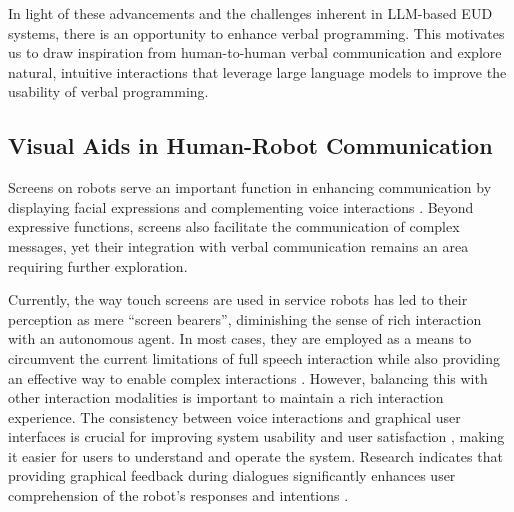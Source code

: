 In light of these advancements and the challenges inherent in LLM-based EUD systems, there is an opportunity to enhance verbal programming. This motivates us to draw inspiration from human-to-human verbal communication and explore natural, intuitive interactions that leverage large language models to improve the usability of verbal programming.



 
\subsection{Visual Aids in Human-Robot Communication}



Screens on robots serve an important function in enhancing communication by displaying facial expressions and complementing voice interactions \cite{glauser_how_2023, you_emi_2020, chen_teaching_2020}. Beyond expressive functions, screens also facilitate the communication of complex messages, yet their integration with verbal communication remains an area requiring further exploration.

Currently, the way touch screens are used in service robots has led to their perception as mere “screen bearers”, diminishing the sense of rich interaction with an autonomous agent.
In most cases, they are employed as a means to circumvent the current limitations of full speech interaction while also providing an effective way to enable complex interactions \cite{bonarini_communication_2020}. 
However, balancing this with other interaction modalities is important to maintain a rich interaction experience. The consistency between voice interactions and graphical user interfaces is crucial for improving system usability and user satisfaction \cite{okamoto_usability_2009}, making it easier for users to understand and operate the system.
Research indicates that providing graphical feedback during dialogues significantly enhances user comprehension of the robot’s responses and intentions \cite{peng_understanding_2020}.


